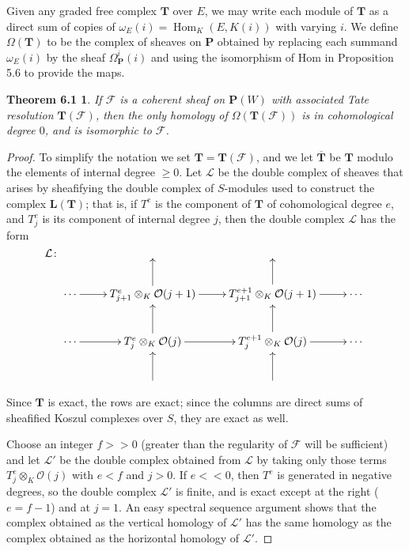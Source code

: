 \documentclass{tran-l}
\newcommand{\myHom}{\operatorname{Hom}}
\newcommand{\F}{\mathcal{F}}
\newcommand{\LL}{\mathbf{L}}
\newcommand{\myP}{\mathbf{P}}
\newcommand{\TT}{\mathbf{T}}
\theoremstyle{plain}
\newtheorem*{theorem25}{Theorem 6.1}
\theoremstyle{remark}
\theoremstyle{definition}
\begin{document}
Given any graded free complex $\TT $ over $E$, we may
write each module of $\TT $ as a direct sum of copies of
$\omega _{E}(i)=\myHom _{K}(E, K(i))$ with varying $i$. We
define
$\Omega (\TT )$ to be the complex of sheaves on $\myP $
obtained by replacing each
summand $\omega _{E}(i)$ by the sheaf $\Omega _{\myP }^{i}(i)$ and using the
isomorphism of Hom in Proposition 5.6 to provide the maps.
\begin{theorem25}
If $\F $ is a
coherent sheaf on $\myP (W)$ with associated Tate resolution
$\TT (\F )$,
then the only homology of  $\Omega (\TT (\F ))$ is
in cohomological degree $0$, and is isomorphic to $\F $.
\end{theorem25}
\begin{proof}  To simplify the notation we set $\TT =\TT (\F )$,
and we let $\overline{\TT }$ be $\TT $
modulo the elements of internal degree
$\geq 0$.
Let $\mathcal{L}$ be the double complex of sheaves that arises by
sheafifying the double complex of $S$-modules used to
construct the complex $\LL (\TT )$; that is, if $T^{e}$ is
the component of $\TT $ of cohomological degree $e$, and
$T^{e}_{j}$ is its component of internal degree $j$, then the
double complex
$\mathcal{L}$ has the form
\begin{equation*}\mathcal{L}\colon \xy \xymatrix {
&&&\\
\dotsb \ar [r]&T_{j+1}^{e}\otimes _{K}\mathcal{O}(j+1)\ar [u]\ar [r]&
T_{j+1}^{e+1}\otimes _{K}\mathcal{O}(j+1)\ar [u]\ar [r]&\dotsb \\
\dotsb \ar [r]&T_{j}^{e}\otimes _{K}\mathcal{O}(j)\ar [r]\ar [u]&T_{j}^{e+1}
\otimes _{K}\mathcal{O}(j)\ar [r]\ar [u]&\dotsb \\
{}&{}\ar [u]&{}\ar [u]&\\
}
\endxy \end{equation*}
Since $\TT $ is exact, the rows are exact; since the columns are
direct sums of sheafified Koszul complexes over $S$, they are
exact as well.

Choose an integer $f>>0$ (greater than the regularity of
$\F $ will be sufficient) and let $\mathcal{L}'$ be the double complex
obtained from $\mathcal{L}$ by taking only those terms $T^{e}_{j}\otimes _{K} \mathcal{O} (j)$
with $e<f$ and $j>0$. If $e<<0$, then $T^{e}$ is generated in negative
degrees, so the double complex $\mathcal{L}'$ is finite, and is exact
except at the right ($e=f-1$) and at $j=1$. An
easy spectral sequence argument shows that the
complex obtained as the vertical homology of $\mathcal{L}'$
has the same homology as the complex obtained as the
horizontal homology of $\mathcal{L}'$.


\end{proof}
\end{document}
